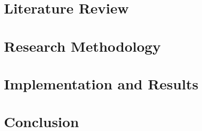 \documentclass[12pt,paper=a4,oneside,cleardoubleage=plain,final]{report}
\newcommand{\comment}[1]{}
\begin{document}
\chapter{Literature Review}


\chapter{Research Methodology}
\label{chap:3}


\chapter{Implementation and Results}
\label{chap:4}


\comment{summary, conclusion and recommendation}
\chapter{Conclusion}



\comment {
Definition. An appendix contains supplementary material that is not an essential part of the text itself but which may be helpful in providing a more comprehensive understanding of the research problem or it is information that is too cumbersome to be included in the body of the paper.
}

\renewcommand{\bibname}{References}



%
\end{document}
